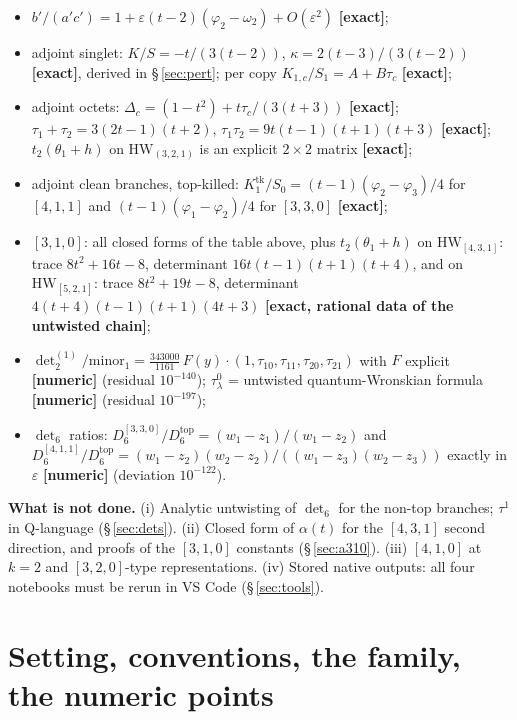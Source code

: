 \documentclass[10pt]{article}
\begin{document}
\begin{itemize}\setlength{\itemsep}{1pt}
\item $b'/(a'c')=1+\varepsilon(t-2)(\varphi_2-\omega_2)+O(\varepsilon^2)$ \textbf{[exact]};
\item adjoint singlet: $K/S=-t/(3(t-2))$, $\kappa=2(t-3)/(3(t-2))$ \textbf{[exact]}, derived in \S\,\ref{sec:pert}; per copy $K_{1,c}/S_1=A+B\tau_c$ \textbf{[exact]};
\item adjoint octets: $\Delta_c=(1-t^2)+t\tau_c/(3(t+3))$ \textbf{[exact]}; $\tau_1+\tau_2=3(2t-1)(t+2)$, $\tau_1\tau_2=9t(t-1)(t+1)(t+3)$ \textbf{[exact]}; $t_2(\theta_1+h)$ on $\mathrm{HW}_{(3,2,1)}$ is an explicit $2\times2$ matrix \textbf{[exact]};
\item adjoint clean branches, top-killed: $K_1^{\mathrm{tk}}/S_0=(t-1)(\varphi_2-\varphi_3)/4$ for $[4,1,1]$ and $(t-1)(\varphi_1-\varphi_2)/4$ for $[3,3,0]$ \textbf{[exact]};
\item $[3,1,0]$: all closed forms of the table above, plus $t_2(\theta_1+h)$ on $\mathrm{HW}_{[4,3,1]}$: trace $8t^2+16t-8$, determinant $16t(t-1)(t+1)(t+4)$, and on $\mathrm{HW}_{[5,2,1]}$: trace $8t^2+19t-8$, determinant $4(t+4)(t-1)(t+1)(4t+3)$ \textbf{[exact, rational data of the untwisted chain]};
\item $\det_2^{(1)}/\mathrm{minor}_1=\frac{343000}{1161}\,F(y)\cdot(1,\tau_{10},\tau_{11},\tau_{20},\tau_{21})$ with $F$ explicit \textbf{[numeric]} (residual $10^{-140}$); $\tau^0_\lambda$ = untwisted quantum-Wronskian formula \textbf{[numeric]} (residual $10^{-197}$);
\item $\det_6$ ratios: $D_6^{[3,3,0]}/D_6^{\mathrm{top}}=(w_1-z_1)/(w_1-z_2)$ and $D_6^{[4,1,1]}/D_6^{\mathrm{top}}=(w_1-z_2)(w_2-z_2)/((w_1-z_3)(w_2-z_3))$ exactly in $\varepsilon$ \textbf{[numeric]} (deviation $10^{-122}$).
\end{itemize}

\textbf{What is not done.} (i) Analytic untwisting of $\det_6$ for the non-top branches; $\tau^1$ in Q-language (\S\,\ref{sec:dets}). (ii) Closed form of $\alpha(t)$ for the $[4,3,1]$ second direction, and proofs of the $[3,1,0]$ constants (\S\,\ref{sec:a310}). (iii) $[4,1,0]$ at $k=2$ and $[3,2,0]$-type representations. (iv) Stored native outputs: all four notebooks must be rerun in VS Code (\S\,\ref{sec:tools}).

\section{Setting, conventions, the family, the numeric points}\label{sec:setting}
\end{document}
